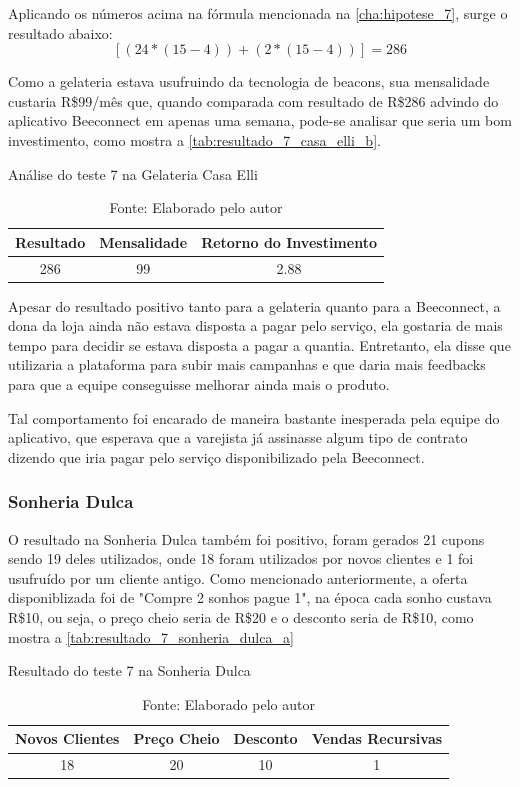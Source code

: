 Aplicando os números acima na fórmula mencionada na \autoref{cha:hipotese_7}, surge o resultado abaixo:
\[[(24 * (15 - 4)) + (2 * (15 - 4))] = 286\]

Como a gelateria estava usufruindo da tecnologia de beacons, sua mensalidade custaria R\$99/mês que, quando comparada com resultado de R\$286 advindo do aplicativo Beeconnect em apenas uma semana, pode-se analisar que seria um bom investimento, como mostra a \autoref{tab:resultado_7_casa_elli_b}. 

\begin{table}[H]
\centering
\caption{Análise do teste 7 na Gelateria Casa Elli}
\label{tab:resultado_7_casa_elli_b}
\begin{tabular}{|c|c|c|}
\hline
Resultado & Mensalidade & Retorno do Investimento \\ \hline
286             & 99          &   2.88 \\ \hline
\end{tabular}
\caption* {Fonte: Elaborado pelo autor}    
\end{table}

Apesar do resultado positivo tanto para a gelateria quanto para a Beeconnect, a dona da loja ainda não estava disposta a pagar pelo serviço, ela gostaria de mais tempo para decidir se estava disposta a pagar a quantia. Entretanto, ela disse que utilizaria a plataforma para subir mais campanhas e que daria mais feedbacks para que a equipe conseguisse melhorar ainda mais o produto.

Tal comportamento foi encarado de maneira bastante inesperada pela equipe do aplicativo, que esperava que a varejista já assinasse algum tipo de contrato dizendo que iria pagar pelo serviço disponibilizado pela Beeconnect.

\subsubsection{Sonheria Dulca}
\label{cha:resultado_sonheria_dulca}
O resultado na Sonheria Dulca também foi positivo, foram gerados 21 cupons sendo 19 deles utilizados, onde 18 foram utilizados por novos clientes e 1 foi usufruído por um cliente antigo. Como mencionado anteriormente, a oferta disponiblizada foi de "Compre 2 sonhos pague 1", na época cada sonho custava R\$10, ou seja, o preço cheio seria de R\$20 e o desconto seria de R\$10, como mostra a \autoref{tab:resultado_7_sonheria_dulca_a}

\begin{table}[H]
\centering
\caption{Resultado do teste 7 na Sonheria Dulca}
\label{tab:resultado_7_sonheria_dulca_a}
\begin{tabular}{|c|c|c|c|}
\hline
Novos Clientes & Preço Cheio & Desconto & Vendas Recursivas \\ \hline
18             & 20          & 10        & 1   \\ \hline
\end{tabular}
\caption* {Fonte: Elaborado pelo autor}    
\end{table}

